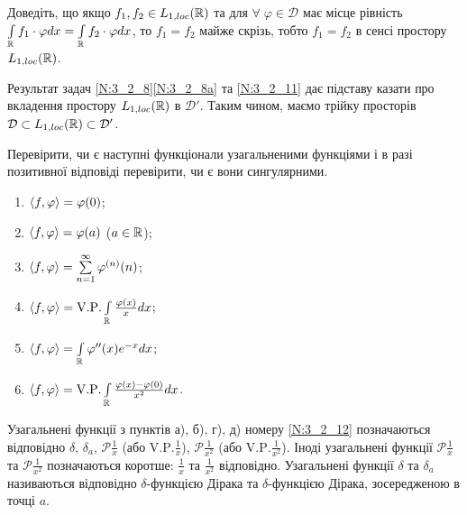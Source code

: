 \begin{exercise}\label{N:3_2_11}
    Доведіть, що якщо $f_1, f_2 \in L_{1, loc}(\mathbb{R})$ та для 
    $\forall \; \varphi \in \mathcal{D}$ має місце рівність 
    $\int\limits_{\mathbb{R}} f_1 \cdot \varphi dx = \int\limits_{\mathbb{R}} f_2 \cdot \varphi dx$,
    то $f_1 = f_2$ майже скрізь, тобто $f_1 = f_2$ в сенсі простору $L_{1, loc}(\mathbb{R})$.
\end{exercise}
\begin{theory}
    Результат задач \ref{N:3_2_8}\ref{N:3_2_8a} та \ref{N:3_2_11} дає підставу казати
    про вкладення простору $L_{1, loc}(\mathbb{R})$ в $\mathcal{D}'$. Таким чином, маємо трійку просторів
    $\mathcal{D} \subset L_{1, loc}(\mathbb{R}) \subset \mathcal{D}'$.
\end{theory}

\begin{exercise}\label{N:3_2_12}
    Перевірити, чи є наступні функціонали узагальненими функціями і в разі позитивної відповіді перевірити,
    чи є вони сингулярними.
    \begin{enumerate}
        \item $\left\langle f, \varphi\right\rangle = \varphi(0)$;
        \item $\left\langle f, \varphi\right\rangle = \varphi(a)$ ($a \in \mathbb{R}$);
        \item $\left\langle f, \varphi\right\rangle = \sum\limits_{n=1}^{\infty}\varphi^{(n)}(n)$;
        \item $\left\langle f, \varphi\right\rangle = \mathrm{V.P.}\int\limits_{\mathbb{R}}^{} \frac{\varphi(x)}{x} dx$;
        \item $\left\langle f, \varphi\right\rangle = \int\limits_{\mathbb{R}}^{} \varphi''(x) e^{-x} dx$;
        \item $\left\langle f, \varphi\right\rangle = \mathrm{V.P.}\int\limits_{\mathbb{R}}^{} \frac{\varphi(x) - \varphi(0)}{x^2} dx$.
    \end{enumerate}
\end{exercise}
\begin{theory}
    Узагальнені функції з пунктів а), б), г), д) номеру \ref{N:3_2_12} позначаються відповідно
    $\delta$, $\delta_a$, $\mathcal{P}\frac{1}{x}$ (або $\mathrm{V.P.} \frac{1}{x}$),
    $\mathcal{P}\frac{1}{x^2}$ (або $\mathrm{V.P.} \frac{1}{x^2}$). Іноді узагальнені функції 
    $\mathcal{P}\frac{1}{x}$ та $\mathcal{P}\frac{1}{x^2}$ позначаються коротше: $\frac{1}{x}$ та
    $\frac{1}{x^2}$ відповідно.
    Узагальнені функції $\delta$ та $\delta_a$ називаються 
    відповідно $\delta$-функцією Дірака та $\delta$-функцією Дірака, зосередженою в точці $a$.
\end{theory}
